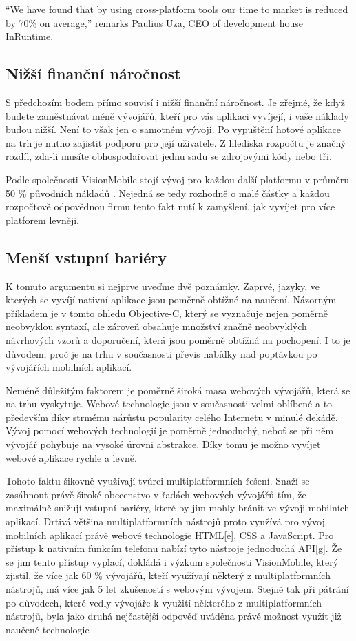 “We have found that by using cross-platform tools our time to market is reduced by 70\% on average,” remarks Paulius Uza, CEO of development house InRuntime. \cite{visionmobile_survey}

\subsection{Nižší finanční náročnost}
S předchozím bodem přímo souvisí i nižší finanční náročnost. Je zřejmé, že když budete zaměstnávat méně vývojářů, kteří pro vás aplikaci vyvíjejí, i vaše náklady budou nižší. Není to však jen o samotném vývoji. Po vypuštění hotové aplikace na trh je nutno zajistit podporu pro její uživatele. Z hlediska rozpočtu je značný rozdíl, zda-li musíte obhospodařovat jednu sadu se zdrojovými kódy nebo tři.

Podle společnosti VisionMobile stojí vývoj pro každou další platformu v průměru 50 \% původních nákladů \cite{visionmobile_survey}. Nejedná se tedy rozhodně o malé částky a každou rozpočtově odpovědnou firmu tento fakt nutí k zamyšlení, jak vyvíjet pro více platforem levněji.

\subsection{Menší vstupní bariéry}
K tomuto argumentu si nejprve uveďme dvě poznámky. Zaprvé, jazyky, ve kterých se vyvíjí nativní aplikace jsou poměrně obtížné na naučení. Názorným příkladem je v tomto ohledu Objective-C, který se vyznačuje nejen poměrně neobvyklou syntaxí, ale zároveň obsahuje množství značně neobvyklých návrhových vzorů a doporučení, která jsou poměrně obtížná na pochopení. I to je důvodem, proč je na trhu v současnosti převis nabídky nad poptávkou po vývojářích mobilních aplikací.

Neméně důležitým faktorem je poměrně široká masa webových vývojářů, která se na trhu vyskytuje. Webové technologie jsou v současnosti velmi oblíbené a to především díky strmému nárůstu popularity celého Internetu v minulé dekádě. Vývoj pomocí webových technologií je poměrně jednoduchý, neboť se při něm vývojář pohybuje na vysoké úrovni abstrakce. Díky tomu je možno vyvíjet webové aplikace rychle a levně.

Tohoto faktu šikovně využívají tvůrci multiplatformních řešení. Snaží se zasáhnout právě široké obecenstvo v řadách webových vývojářů tím, že maximálně snižují vstupní bariéry, které by jim mohly bránit ve vývoji mobilních aplikací. Drtivá většina multiplatformních nástrojů proto využívá pro vývoj mobilních aplikací právě webové technologie HTML[e], CSS a JavaScript. Pro přístup k nativním funkcím telefonu nabízí tyto nástroje jednoduchá API[g]. Že se jim tento přístup vyplací, dokládá i výzkum společnosti VisionMobile, který zjistil, že více jak 60 \% vývojářů, kteří využívají některý z multiplatformních nástrojů, má více jak 5 let zkušeností s webovým vývojem. Stejně tak při pátrání po důvodech, které vedly vývojáře k využití některého z multiplatformních nástrojů, byla jako druhá nejčastější odpověď uváděna právě možnost využít již naučené technologie \cite{visionmobile_survey}.

